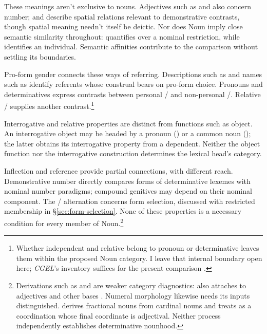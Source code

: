 \documentclass[12pt]{article}
\begin{document}
These meanings aren't exclusive to nouns. Adjectives such as  and  also concern number;  and  describe spatial relations relevant to demonstrative contrasts, though spatial meaning needn't itself be deictic. Nor does Noun imply close semantic similarity throughout:  quantifies over a nominal restriction, while  identifies an individual. Semantic affinities contribute to the comparison without settling its boundaries.

Pro-form gender \citep{reynolds2025proformgender} connects these ways of referring. Descriptions such as  and names such as  identify referents whose construal bears on pro-form choice. Pronouns and determinatives express contrasts between personal / and non-personal /. Relative / supplies another contrast.\footnote{Whether independent  and relative  belong to pronoun or determinative leaves them within the proposed Noun category. I leave that internal boundary open here; \textit{CGEL}'s inventory suffices for the present comparison \citep[397--399]{huddleston2002}.}

Interrogative and relative properties are distinct from functions such as object. An interrogative object may be headed by a pronoun () or a common noun (); the latter obtains its interrogative property from a dependent. Neither the object function nor the interrogative construction determines the lexical head's category.

Inflection and reference provide partial connections, with different reach. Demonstrative number directly compares forms of determinative lexemes with nominal number paradigms; compound genitives may depend on their nominal component. The /\allowbreak{} alternation concerns form selection, discussed with restricted membership in §\ref{sec:form-selection}. None of these properties is a necessary condition for every member of Noun.\footnote{Derivations such as  and  are weaker category diagnostics:  also attaches to adjectives and other bases \citep[Ch.~19, §5.7.2(i)]{huddleston2002}. Numeral morphology likewise needs its inputs distinguished. \textcite[§§5.4--5.5]{reynolds2026numerals} derives fractional nouns from cardinal nouns and treats  as a coordination whose final coordinate is adjectival. Neither process independently establishes determinative nounhood.}
\end{document}
